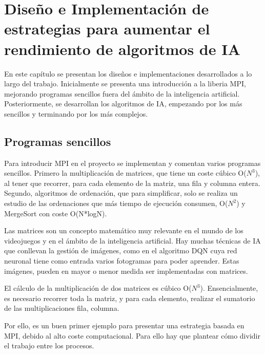 

\chapter{Diseño e Implementación de estrategias para aumentar el rendimiento de algoritmos de IA}
\label{cap:c3_implementaciones}	


	
	En este capítulo se presentan los diseños e implementaciones desarrollados a lo largo del trabajo. Inicialmente se presenta una introducción a la liberia MPI, mejorando programas sencillos fuera del ámbito de la inteligencia artificial. Posteriormente, se desarrollan los algoritmos de IA, empezando por los más sencillos y terminando por los más complejos.

\section{Programas sencillos}
\label{cap:c3_1}

	Para introducir MPI en el proyecto se implementan y comentan varios programas sencillos. Primero la multiplicación de matrices, que tiene un coste cúbico O(\(N^{3}\)), al tener que recorrer, para cada elemento de la matriz, una fila y columna entera. Segundo, algoritmos de ordenación, que para simplificar, solo se realiza un estudio de las ordenaciones que más tiempo de ejecución consumen, O(\(N^{2}\)) y MergeSort con coste O(N*logN).


	Las matrices son un concepto matemático muy relevante en el mundo de los videojuegos y en el ámbito de la inteligencia artificial. Hay muchas técnicas de IA que conllevan la gestión de imágenes, como en el algoritmo DQN cuya red neuronal tiene como entrada varios fotogramas para poder aprender. Estas imágenes, pueden en mayor o menor medida ser implementadas con matrices.
	
	El cálculo de la multiplicación de dos matrices es cúbico O(\(N^{3}\)). Ensencialmente, es necesario recorrer toda la matriz, y para cada elemento, realizar el sumatorio de las multiplicaciones fila, columna. 
	
	Por ello, es un buen primer ejemplo para presentar una estrategia basada en MPI, debido al alto coste computacional. Para ello hay que plantear cómo dividir el trabajo entre los procesos. 
	
